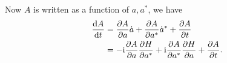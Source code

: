 \documentclass[hyperref, a4paper]{article}
\newcommand*{\ii}{\mathrm{i}}
\begin{document}
Now $A$ is written as a function of $a, a^*$, we have 
\begin{equation}
    \begin{aligned}
        \dv{A}{t} &= \pdv{A}{a} \dot{a} + \pdv{A}{a^*} \dot{a}^* + \pdv{A}{t} \\
        &= - \ii \pdv{A}{a} \pdv{H}{a^*} + \ii \pdv{A}{a^*} \pdv{H}{a} + \pdv{A}{t} .
    \end{aligned}
\end{equation}
\end{document}

